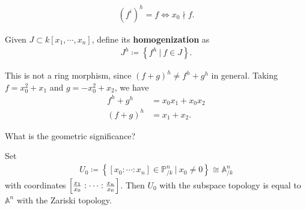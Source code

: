 \begin{remark}

\begin{align*}  
(f^i)^h = f \iff x_0 \nmid f
.\end{align*}

\end{remark}

\begin{definition}

Given \(J\subset k[x_1, \cdots, x_{n}]\), define its
\textbf{homogenization} as
\begin{align*}  
J^h \coloneqq\left\{{f^h {~\mathrel{\Big|}~}f\in J}\right\}
.\end{align*}

\end{definition}

\begin{example}

This is not a ring morphism, since \((f+g)^h \neq f^h + g^h\) in
general. Taking \(f = x_0^2 + x_1\) and \(g= -x_0^2 + x_2\), we have
\begin{align*}  
f^h + g^h &= x_0 x_1 + x_0 x_2 \\ 
(f+g)^h &= x_1 + x_2
.\end{align*}

\end{example}

What is the geometric significance?

\begin{proposition}

Set
\begin{align*}
U_0 \coloneqq\left\{{{\left[ {x_0: \cdots :x_n} \right]} \in {\mathbb{P}}^n_{/k} {~\mathrel{\Big|}~}x_0 \neq 0 }\right\} \cong {\mathbb{A}}^n_{/k}
\end{align*}
with coordinates
\({\left[ {{x_1\over x_0} : \cdots : {x_n \over x_0}} \right]}\). Then
\(U_0\) with the subspace topology is equal to \({\mathbb{A}}^n\) with
the Zariski topology.

\end{proposition}


